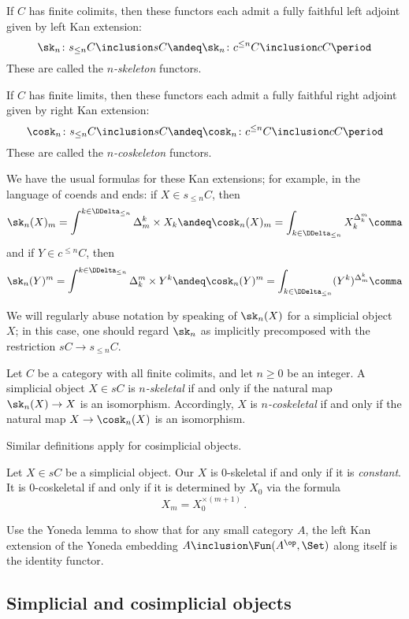 If $C$ has finite colimits, then these functors each admit a fully faithful left adjoint given by left Kan extension:
\[
  \sk_n \colon s_{\leq n}C \inclusion sC
  \andeq
  \sk_n \colon c^{\leq n}C \inclusion cC \period
\]
These are called the \emph{$n$-skeleton} functors.

If $C$ has finite limits, then these functors each admit a fully faithful right adjoint given by right Kan extension:
\[
  \cosk_n \colon s_{\leq n}C \inclusion sC
  \andeq
  \cosk_n \colon c^{\leq n}C \inclusion cC \period
\]
These are called the \emph{$n$-coskeleton} functors.

We have the usual formulas for these Kan extensions;
for example, in the language of coends and ends:
if $X \in s_{\leq n}C$, then
\[
  \sk_n(X)_m = \int^{k \in \DDelta_{\leq n}} \Delta^k_m \times X_k
  \andeq
  \cosk_n(X)_m = \int_{k \in \DDelta_{\leq n}} X_k^{\Delta^m_k} \comma
\]
and if $Y \in c^{\leq n}C$, then
\[
  \sk_n(Y)^m = \int^{k \in \DDelta_{\leq n}} \Delta^m_k \times Y^k
  \andeq
  \cosk_n(Y)^m = \int_{k \in \DDelta_{\leq n}} (Y^k)^{\Delta^k_m} \comma
\]

We will regularly abuse notation by speaking of $\sk_n(X)$ for a simplicial object $X$;
in this case, one should regard $\sk_n$ as implicitly precomposed with the restriction $sC \to s_{\leq n}C$.

\begin{definition}
  Let $C$ be a category with all finite colimits, and let $n \geq 0$ be an integer.
  A simplicial object $X \in sC$ is \emph{$n$-skeletal} if and only if the natural map $\sk_n(X) \to X$ is an isomorphism.
  Accordingly, $X$ is \emph{$n$-coskeletal} if and only if the natural map $X \to \cosk_n(X)$ is an isomorphism.

  Similar definitions apply for cosimplicial objects.
\end{definition}

\begin{eg}
  Let $X \in sC$ be a simplicial object.
  Our $X$ is $0$-skeletal if and only if it is \emph{constant}.
  It is $0$-coskeletal if and only if it is determined by $X_0$ via the formula
  \[
    X_m = X_0^{\times(m+1)} \period
  \]
\end{eg}



\begin{exercises}
  \item%
    Use the Yoneda lemma to show that for any small category $A$,
    the left Kan extension of the Yoneda embedding $A \inclusion \Fun(A^{\op}, \Set)$ along itself is the identity functor.
\end{exercises}


\subsection{Simplicial and cosimplicial objects}%
\label{sub:Simplicialandcosimplicialobjects}




